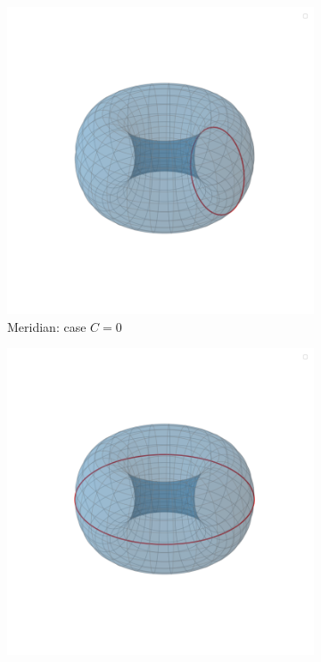 \documentclass[12pt]{article}
\begin{document}
\begin{figure}[ht]
	\centering
	\begin{subfigure}[b]{0.4\linewidth}
	  \centering
	  \includegraphics[width=1.0\textwidth]{images/torus_merd.png}
 	  \caption{Meridian: case $C=0$}
	  \label{subfig:vertical}
	\end{subfigure}
	\hfill
	\begin{subfigure}[b]{0.4\linewidth}
	  \centering
	  \includegraphics[width=1.0\textwidth]{images/torus_par.png}

\end{subfigure}
\end{figure}
\end{document}
